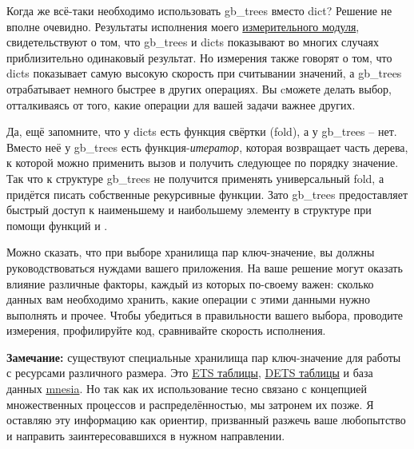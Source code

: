 Когда же всё\--таки необходимо использовать gb\_trees вместо dict?
Решение не вполне очевидно.
Результаты исполнения моего \href{http://learnyousomeerlang.com/static/erlang/keyval\_benchmark.erl}{измерительного модуля}, свидетельствуют о том, что gb\_trees и dicts показывают во многих случаях приблизительно одинаковый результат.
Но измерения также говорят о том, что dicts показывает самую высокую скорость при считывании значений, а gb\_trees отрабатывает немного быстрее в других операциях.
Вы cможете делать выбор, отталкиваясь от того, какие операции для вашей задачи важнее других.

Да, ещё запомните, что у dicts есть функция свёртки (fold), а у gb\_trees \--- нет.
Вместо неё у gb\_trees есть функция\--\emph{итератор}, которая возвращает часть дерева, к которой можно применить вызов  и получить следующее по порядку значение.
Так что к структуре gb\_trees не получится применять универсальный fold, а придётся писать собственные рекурсивные функции.
Зато gb\_trees предоставляет быстрый доступ к наименьшему и наибольшему элементу в структуре при помощи функций  и .

Можно сказать, что при выборе хранилища пар ключ\--значение, вы должны руководствоваться нуждами вашего приложения.
На ваше решение могут оказать влияние различные факторы, каждый из которых по\--своему важен: сколько данных вам необходимо хранить, какие операции с этими данными нужно выполнять и прочее.
Чтобы убедиться в правильности вашего выбора, проводите измерения, профилируйте код, сравнивайте скорость исполнения.\\
\colorbox{lgray}
{
\begin{minipage}{1.0\linewidth}
    \textbf{Замечание:} существуют специальные хранилища пар ключ\--значение для работы с ресурсами различного размера.
    Это \href{http://erldocs.com/R15B/stdlib/ets.html}{ETS таблицы}, \href{http://erldocs.com/R15B/stdlib/dets.html}{DETS таблицы} и база данных \href{http://erldocs.com/R15B/mnesia/mnesia.html?search=mnesia&i=0}{mnesia}.
    Но так как их использование тесно связано с концепцией множественных процессов и распределённостью, мы затронем их позже.
    Я оставляю эту информацию как ориентир, призванный разжечь ваше любопытство и направить заинтересовавшихся в нужном направлении.
\end{minipage}
}
